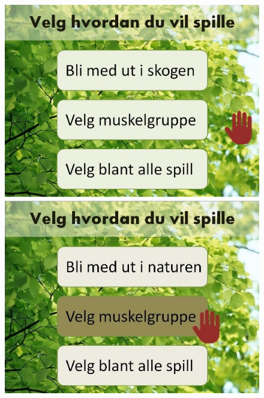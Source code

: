 \begin{figure} [H]
\centering
\includegraphics[scale=0.5]{menuAvatarAction.jpg}
\label{fig:avatarActionNorsk}
\end{figure} 

